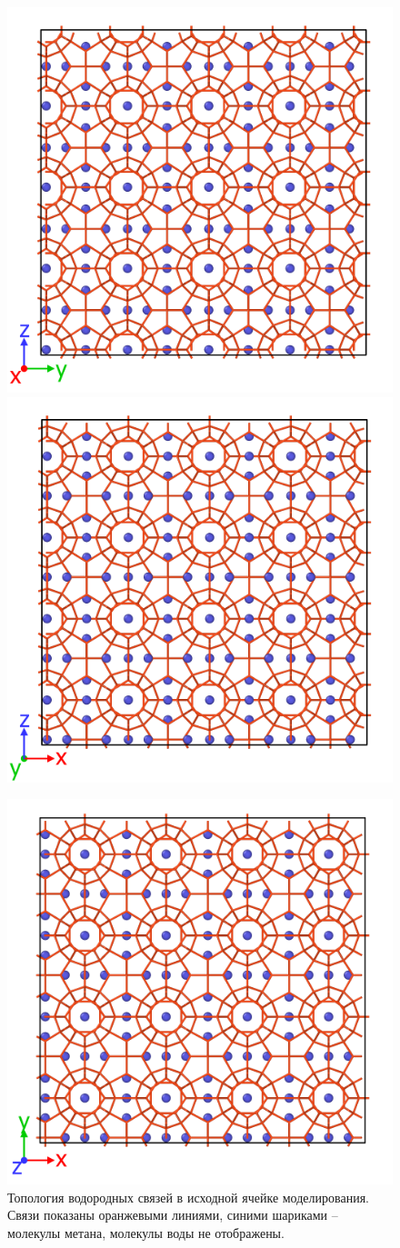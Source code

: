 \begin{figure}[H]
    \centering
    \begin{minipage}{\linewidth}
    \includegraphics[width=.49\linewidth]{figures/unit1a.png}
    \includegraphics[width=.49\linewidth]{figures/unit2a.png}
    \end{minipage}
    \begin{minipage}{\linewidth}
        \centering
        \includegraphics[width=.5\linewidth]{figures/unit3a.png}
    \end{minipage}
    \caption{Топология водородных связей в исходной ячейке моделирования. Связи показаны оранжевыми линиями, синими шариками -- молекулы метана, молекулы воды не отображены.}
    \label{fig3.2}
\end{figure}

